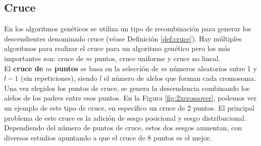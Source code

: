 \subsection{Cruce}

En los algoritmos genéticos se utiliza un tipo de recombinación para generar los descendientes denominado cruce (véase Definición \ref{def:cruce}). Hay múltiples algoritmos para realizar el cruce para un algoritmo genético pero los más importantes son: cruce de $m$ puntos, cruce uniforme y cruce no lineal.\\

El \textbf{cruce de $m$ puntos} se basa en la selección de $m$ números aleatorios entre 1 y $l-1$ (sin repeticiones), siendo $l$ el número de alelos que forman cada cromosoma. Una vez elegidos los puntos de cruce, se genera la descendencia combinando los alelos de los padres entre esos puntos. En la Figura \ref{fig:2xcrossover}, podemos ver un ejemplo de este tipo de cruce, en específico un cruce de 2 puntos. El principal problema de este cruce es la adición de sesgo posicional y sesgo distribucional. Dependiendo del número de puntos de cruce, estos dos sesgos aumentan, con diversos estudios apuntando a que el cruce de 8 puntos es el mejor.


